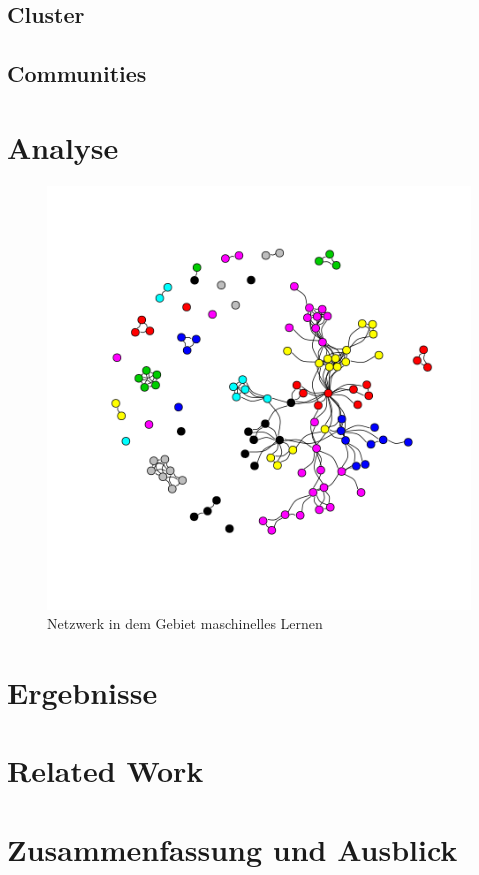 \documentclass{acm_proc_article-sp}
\begin{document}
\subsection{Cluster}
\subsection{Communities}
\section{Analyse}
\begin{figure}
\centering
\includegraphics[scale=0.5]{../visualization/ml_community_graph.png}
\caption{Netzwerk in dem Gebiet maschinelles Lernen}
\end{figure}
\section{Ergebnisse}
\section{Related Work}
\section{Zusammenfassung und Ausblick}
\cite{*}


\end{document}
